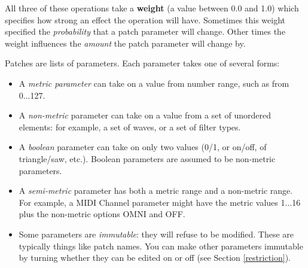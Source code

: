 \documentclass{article}
\begin{document}
{All three of these operations take a {\bf weight} (a value between 0.0 and 1.0) which specifies how strong an effect the operation will have.  Sometimes this weight specified the {\it probability} that a patch parameter will change.  Other times the weight influences the {\it amount} the patch parameter will change by.

Patches are lists of parameters.   Each parameter takes one of several forms:

\begin{itemize}
\item A {\it metric parameter} can take on a value from number range, such as from 0...127.
\item A {\it non-metric} parameter can take on a value from a set of unordered elements: for example, a set of waves, or a set of filter types.
\item A {\it boolean} parameter can take on only two values (0/1, or on/off, of triangle/saw, etc.).  Boolean parameters are assumed to be non-metric parameters.
\item A {\it semi-metric} parameter has both a metric range and a non-metric range.  For example, a MIDI Channel parameter might have the metric values 1...16 plus the non-metric options OMNI and OFF.
\item Some parameters are {\it immutable}: they will refuse to be modified.  These are typically things like patch names.  You can make other parameters immutable by turning whether they can be edited on or off (see Section \ref{restriction}).
\end{itemize}

}
\end{document}
